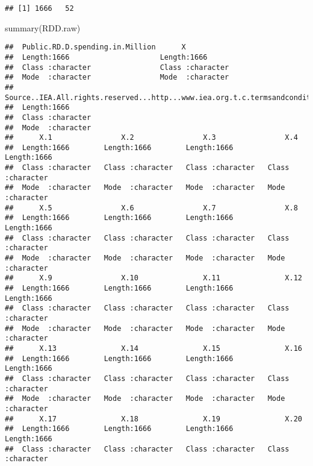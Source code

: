 \documentclass[
]{article}
\newenvironment{Shaded}{\begin{snugshade}}{\end{snugshade}}
\newcommand{\FunctionTok}[1]{\textcolor[rgb]{0.00,0.00,0.00}{#1}}
\newcommand{\NormalTok}[1]{#1}
\begin{document}
\begin{verbatim}
## [1] 1666   52
\end{verbatim}

\begin{Shaded}
\begin{Highlighting}[]
\FunctionTok{summary}\NormalTok{(RDD.raw)}
\end{Highlighting}
\end{Shaded}

\begin{verbatim}
##  Public.RD.D.spending.in.Million      X            
##  Length:1666                     Length:1666       
##  Class :character                Class :character  
##  Mode  :character                Mode  :character  
##  Source..IEA.All.rights.reserved...http...www.iea.org.t.c.termsandconditions...
##  Length:1666                                                                   
##  Class :character                                                              
##  Mode  :character                                                              
##      X.1                X.2                X.3                X.4           
##  Length:1666        Length:1666        Length:1666        Length:1666       
##  Class :character   Class :character   Class :character   Class :character  
##  Mode  :character   Mode  :character   Mode  :character   Mode  :character  
##      X.5                X.6                X.7                X.8           
##  Length:1666        Length:1666        Length:1666        Length:1666       
##  Class :character   Class :character   Class :character   Class :character  
##  Mode  :character   Mode  :character   Mode  :character   Mode  :character  
##      X.9                X.10               X.11               X.12          
##  Length:1666        Length:1666        Length:1666        Length:1666       
##  Class :character   Class :character   Class :character   Class :character  
##  Mode  :character   Mode  :character   Mode  :character   Mode  :character  
##      X.13               X.14               X.15               X.16          
##  Length:1666        Length:1666        Length:1666        Length:1666       
##  Class :character   Class :character   Class :character   Class :character  
##  Mode  :character   Mode  :character   Mode  :character   Mode  :character  
##      X.17               X.18               X.19               X.20          
##  Length:1666        Length:1666        Length:1666        Length:1666       
##  Class :character   Class :character   Class :character   Class :character  

\end{verbatim}
\end{document}
